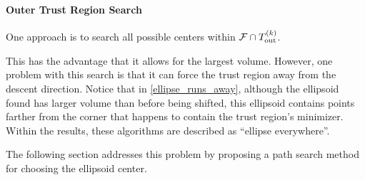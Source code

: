 \paragraph{Outer Trust Region Search}

One approach is to search all possible centers within ${\mathcal F} \cap {T_{\text{out}}^{(k)}} $.  

This has the advantage that it allows for the largest volume.
However, one problem with this search is that it can force the trust region away from the descent direction.
Notice that in \cref{ellipse_runs_away}, although the ellipsoid found has larger volume than before being shifted, 
this ellipsoid contains points farther from the corner that happens to contain the trust region's minimizer.
Within the results, these algorithms are described as ``ellipse everywhere''.

The following section addresses this problem by proposing a path search method for choosing the ellipsoid center.

